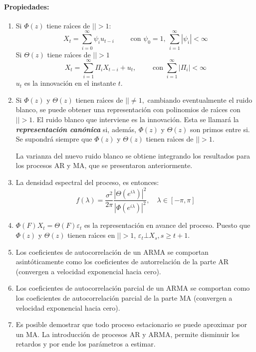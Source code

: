 \paragraph{Propiedades:}
\begin{enumerate}
\item Si $\Phi (z)$ tiene ra\'{\i}ces de $\left| \right|> 1$:
\[
 X_{t} =\sum_{i=0}^\infty {\psi_{i} u_{t-i} }\qquad\text{ con }\psi_{0} =1,\ \sum_{i=1}^\infty {\left| {\psi_{i} } \right|<\infty } 
\]
Si $\Theta (z)$ tiene ra\'{\i}ces de $\left| \right|>1$
\[
X_{t}=\sum_{i=1}^\infty {{\Pi }_{i}X_{t-i}} +u_{t}, 
\qquad\text{ con }\sum_{i=1}^\infty \left| {\Pi }_{i} 
\right| {<\infty  }
\]
$u_{{t}}$ es la innovaci\'{o}n en el instante $t$.

\item Si $\Phi (z)$ y $\Theta (z)$ tienen ra\'{\i}ces de $\left| \right|\ne 1,$ cambiando eventualmente el ruido blanco, se puede obtener una representaci\'{o}n con polinomios de ra\'{\i}ces con $\left| \right|>1$. El ruido blanco que interviene es la innovaci\'{o}n. Esta se llamar\'{a} la \textbf{\textit{representaci\'{o}n can\'{o}nica}} si, adem\'{a}s, $\Phi (z)$ y $\Theta (z)$ son primos entre si. Se supondr\'{a} siempre que $\Phi (z)$ y $\Theta (z)$ tienen ra\'{\i}ces de $\left| \right|>1$.

La varianza del nuevo ruido blanco se obtiene integrando los resultados para 
los procesos AR y MA, que se presentaron anteriormente.

\item La densidad espectral del proceso, es entonces:
\[
f\left( \lambda \right)=\frac{\sigma^{2}}{2\pi }\frac{\left| {\Theta 
(e^{i\lambda })} \right|^{2}}{\left| {\Phi (e^{i\lambda })} \right|^{2}},
\quad
\lambda \in \left[ {-\pi ,\pi } \right]
\]

\item $\Phi (F)X_{t} =\Theta (F)\varepsilon_{t} $ es la representaci\'{o}n en avance del proceso. Puesto que $\Phi (z)$ y $\Theta (z)$ tienen ra\'{\i}ces en $\left| \right|>1$, $\varepsilon_{t} \bot X_{s} ,s\ge t+1$.

\item Los coeficientes de autocorrelaci\'{o}n de un ARMA se comportan asint\'{o}ticamente como los coeficientes de autorrelaci\'{o}n de la parte AR (convergen a velocidad exponencial hacia cero).
\item Los coeficientes de autocorrelaci\'{o}n parcial de un ARMA se comportan como los coeficientes de autocorrelaci\'{o}n parcial de la parte MA (convergen a velocidad exponencial hacia cero).

\item Es posible demostrar que todo proceso estacionario se puede aproximar por un MA. La introducci\'{o}n de procesos AR y ARMA, permite disminuir los retardos y por ende los par\'{a}metros a estimar.
\end{enumerate}

